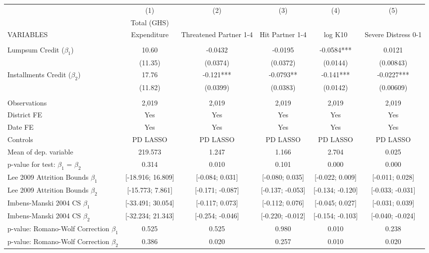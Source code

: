 \begin{tabular}{lccccc} \hline
 & (1) & (2) & (3) & (4) & (5) \\
 & Total (GHS) &  &  &  &  \\
VARIABLES & Expenditure & Threatened Partner 1-4 & Hit Partner 1-4 & log K10 & Severe Distress 0-1 \\ \hline
 &  &  &  &  &  \\
Lumpsum Credit ($\beta_1$) & 10.60 & -0.0432 & -0.0195 & -0.0584*** & 0.0121 \\
 & (11.35) & (0.0374) & (0.0372) & (0.0144) & (0.00843) \\
Installments Credit ($\beta_2$) & 17.76 & -0.121*** & -0.0793** & -0.141*** & -0.0227*** \\
 & (11.82) & (0.0399) & (0.0383) & (0.0142) & (0.00609) \\
 &  &  &  &  &  \\
Observations & 2,019 & 2,019 & 2,019 & 2,019 & 2,019 \\
District FE & Yes & Yes & Yes & Yes & Yes \\
Date FE & Yes & Yes & Yes & Yes & Yes \\
Controls & PD LASSO & PD LASSO & PD LASSO & PD LASSO & PD LASSO \\
Mean of dep. variable & 219.573 & 1.247 & 1.166 & 2.704 & 0.025 \\
p-value for test: $\beta_1$ = $\beta_2$ & 0.314 & 0.010 & 0.101 & 0.000 & 0.000 \\
Lee 2009 Attrition Bounds $\beta_1$ & [-18.916; 16.809] & [-0.084; 0.031] & [-0.080; 0.035] & [-0.022; 0.009] & [-0.011; 0.028] \\
Lee 2009 Attrition Bounds $\beta_2$ & [-15.773; 7.861] & [-0.171; -0.087] & [-0.137; -0.053] & [-0.134; -0.120] & [-0.033; -0.031] \\
Imbens-Manski 2004 CS $\beta_1$ & [-33.491; 30.054] & [-0.117; 0.073] & [-0.112; 0.076] & [-0.045; 0.027] & [-0.031; 0.039] \\
Imbens-Manski 2004 CS $\beta_2$ & [-32.234; 21.343] & [-0.254; -0.046] & [-0.220; -0.012] & [-0.154; -0.103] & [-0.040; -0.024] \\
p-value: Romano-Wolf Correction $\beta_1$ & 0.525 & 0.525 & 0.980 & 0.010 & 0.238 \\
 p-value: Romano-Wolf Correction $\beta_2$ & 0.386 & 0.020 & 0.257 & 0.010 & 0.020 \\ \hline
\end{tabular}
